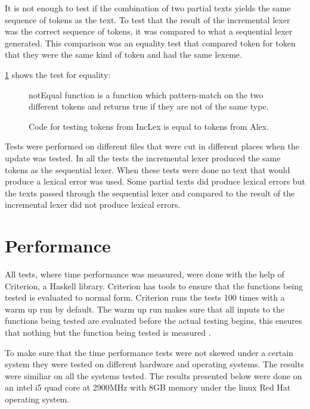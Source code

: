 It is not enough to test if the combination of two partial texts yields the
same sequence of tokens as the text. To test that the result of the incremental
lexer was the correct sequence of tokens, it was compared to what a sequential 
lexer generated. This comparison was an equality test that compared token for
token that they were the same kind of token and had the same lexeme.

\cref{fig:CheckEquility} shows the test for equality:
\begin{figure}[h!]
  \begin{center}
  
  \end{center}
  notEqual function is a function which pattern-match on the two different
  tokens and returns true if they are not of the same type.
  \caption{Code for testing tokens from IncLex is equal to tokens from Alex. 
  \label{fig:CheckEquility}}
\end{figure}

Tests were performed on different files that were cut in different places when
the update was tested. In all the tests the incremental lexer produced the same
tokens as the sequential lexer. When these tests were done no text that would
produce a lexical error was used. Some partial texts did produce lexical errors
but the texts passed through the sequential lexer and compared to the result of
the incremental lexer did not produce lexical errors.

\section{Performance}
All tests, where time performance was measured, were done with the help of
Criterion, a Haskell library. Criterion has tools to ensure that the functions
being tested is evaluated to normal form. Criterion runs the tests 100 times
with a warm up run by default. The warm up run makes sure that all inputs to the
functions being tested are evaluated before the actual testing begins, this
ensures that nothing but the function being tested is measured \cite{criterion}.

To make sure that the time performance tests were not skewed under a certain
system they were tested on different hardware and operating systems. The results
were similiar on all the systems tested. The results presented below were done
on an intel i5 quad core at 2900MHz with 8GB memory under the linux Red Hat
operating system.

